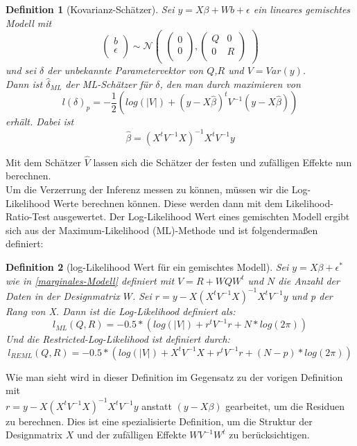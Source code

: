 \documentclass[%
thesis=student,%
coverpage=false,%
titlepage=false,%
headmarks=true, %
german,%
font=libertine, %
math=newpxtx, %
BCOR=5mm,%
coverBCOR=11mm%
]{tumbook}
\theoremstyle{break}
\newtheorem{definition}{Definition}[section]
\begin{document}
\begin{definition}[Kovarianz-Schätzer]
	Sei $y = X\beta + Wb + \epsilon $ ein lineares gemischtes Modell mit $$\begin{pmatrix}
		b \\
		\epsilon \\
	\end{pmatrix}
	\sim
	\mathcal{N}
	\begin{pmatrix}
		\begin{pmatrix}
			
			0 \\
			0 \\
		\end{pmatrix},
		\begin{pmatrix}
			Q & 0 \\
			0 & R \\
		\end{pmatrix}
	\end{pmatrix}$$ und sei $\delta$ der unbekannte Parametervektor von $Q$,$R$ und $V=Var(y)$. \\
	Dann ist $\hat{\delta}_{ML}$ der ML-Schätzer für $\delta$, den man durch maximieren von $$  l(\delta)_p = - \frac{1}{2} (log(|V|)+(y-X\hat{\beta})^tV^{-1}(y-X\hat{\beta})) $$erhält.
	Dabei ist $$ \hat{\beta} = (X^tV^{-1}X)^{-1}X^tV^{-1}y$$
\end{definition} \noindent
Mit dem Schätzer $\hat{V}$ lassen sich die Schätzer der festen und zufälligen Effekte nun berechnen.\\
Um die Verzerrung der Inferenz messen zu können, müssen wir die  Log-Likelihood Werte berechnen können. Diese werden dann mit dem Likelihood-Ratio-Test ausgewertet. Der Log-Likelihood Wert eines gemischten Modell ergibt sich aus der Maximum-Likelihood (ML)-Methode und ist folgendermaßen definiert:
\begin{definition}[log-Likelihood Wert für ein gemischtes Modell]
	Sei $y=X\beta + \epsilon^*$ wie in \ref{marginales-Modell} definiert mit $V = R + WQW^t$ und $N$ die Anzahl der Daten in der Designmatrix $W$. Sei $r = y - X(X^tV^{-1}X)^{-1}X^tV^{-1}y$ und p der Rang von X. Dann ist  die Log-Likelihood definiert als:
	$$ l_{ML}(Q,R) = -0.5 * (log(|V|)+ r^tV^{-1}r + N * log(2\pi))$$
	Und die Restricted-Log-Likelihood ist definiert durch:
	$$l_{REML}(Q,R) = -0.5 * (log(|V|)+ X^tV^{-1}X + r^tV^{-1}r+ (N-p) * log(2\pi))$$ \label{def:log-likelihood}
\end{definition}\noindent
Wie man sieht wird in dieser Definition im Gegensatz zu der vorigen Definition mit \\ $r=y - X(X^tV^{-1}X)^{-1}X^tV^{-1}y$ anstatt $(y-X\beta)$ gearbeitet, um die Residuen zu berechnen. Dies ist eine spezialisierte Definition, um die Struktur der Designmatrix $X$ und der zufälligen Effekte $WV^{-1}W^t$ zu berücksichtigen.\\
\end{document}
